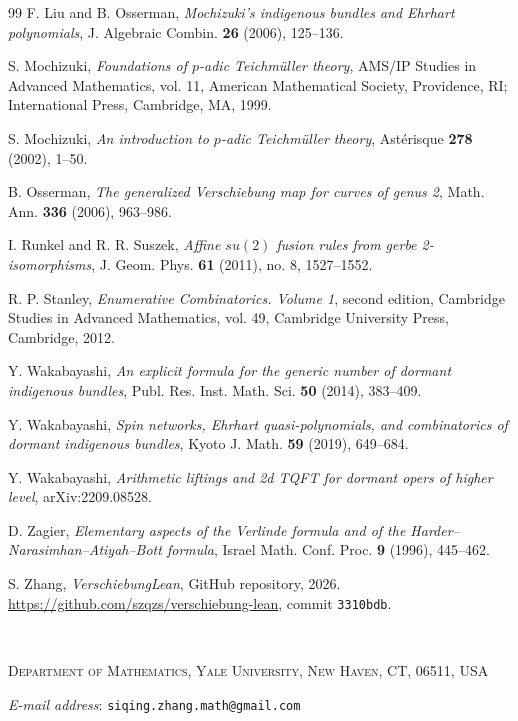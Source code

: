 \documentclass[11pt]{amsart}
\begin{document}
\begin{thebibliography}{99}
F. Liu and B. Osserman,
\emph{Mochizuki's indigenous bundles and Ehrhart polynomials},
J. Algebraic Combin. \textbf{26} (2006), 125--136.

S. Mochizuki,
\emph{Foundations of \(p\)-adic Teichm\"uller theory},
AMS/IP Studies in Advanced Mathematics, vol. 11, American Mathematical
Society, Providence, RI; International Press, Cambridge, MA, 1999.

S. Mochizuki,
\emph{An introduction to \(p\)-adic Teichm\"uller theory},
Ast\'erisque \textbf{278} (2002), 1--50.


B. Osserman,
\emph{The generalized Verschiebung map for curves of genus 2},
Math. Ann. \textbf{336} (2006), 963--986.

I. Runkel and R. R. Suszek,
\emph{Affine \(su(2)\) fusion rules from gerbe 2-isomorphisms},
J. Geom. Phys. \textbf{61} (2011), no. 8, 1527--1552.

R. P. Stanley,
\emph{Enumerative Combinatorics. Volume 1},
second edition,
Cambridge Studies in Advanced Mathematics, vol. 49,
Cambridge University Press, Cambridge, 2012.

Y. Wakabayashi,
\emph{An explicit formula for the generic number of dormant indigenous
bundles},
Publ. Res. Inst. Math. Sci. \textbf{50} (2014), 383--409.

Y. Wakabayashi,
\emph{Spin networks, Ehrhart quasi-polynomials, and combinatorics of dormant
indigenous bundles},
Kyoto J. Math. \textbf{59} (2019), 649--684.

Y. Wakabayashi,
\emph{Arithmetic liftings and 2d TQFT for dormant opers of higher level},
arXiv:2209.08528.

D. Zagier,
\emph{Elementary aspects of the Verlinde formula and of the
Harder--Narasimhan--Atiyah--Bott formula},
Israel Math. Conf. Proc. \textbf{9} (1996), 445--462.

S. Zhang,
\emph{VerschiebungLean},
GitHub repository, 2026.
\url{https://github.com/szqzs/verschiebung-lean},
commit \texttt{3310bdb}.

\end{thebibliography}

\;\\

\footnotesize{
 \textsc{Department of Mathematics, Yale University,  New Haven, CT, 06511,
USA}\par\nopagebreak
  \textit{E-mail address}: \texttt{siqing.zhang.math@gmail.com}}
\end{document}
